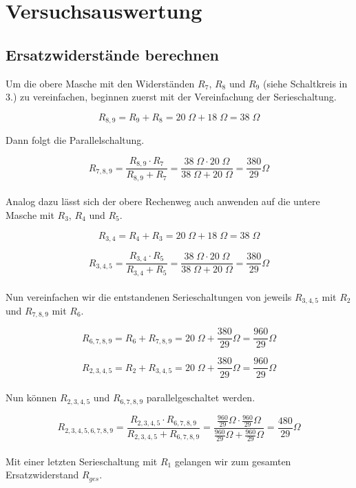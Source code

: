 \documentclass[a4paper,12pt]{article}
\begin{document}
\newpage

\section{Versuchsauswertung}

\subsection{Ersatzwiderstände berechnen}

Um die obere Masche mit den Widerständen $R_7$, $R_8$ und $R_9$ (siehe Schaltkreis in 3.) zu vereinfachen, beginnen zuerst mit der Vereinfachung der Serieschaltung.

$$R_{8,9} = R_9 + R_8 = 20\;\Omega + 18 \;\Omega = 38 \;\Omega$$

Dann folgt die Parallelschaltung.

$$R_{7,8,9} = \frac{R_{8,9} \cdot R_7}{R_{8,9} + R_7} = \frac{38 \;\Omega \cdot 20\; \Omega}{38\; \Omega + 20\; \Omega} = \frac{380}{29}\Omega$$\\

Analog dazu lässt sich der obere Rechenweg auch anwenden auf die untere Masche mit $R_3$, $R_4$ und $R_5$.

$$R_{3,4} = R_4 + R_3 = 20 \;\Omega + 18 \;\Omega = 38 \;\Omega$$

$$R_{3,4,5} = \frac{R_{3,4} \cdot R_5}{R_{3,4} + R_5} = \frac{38\; \Omega \cdot 20\; \Omega}{38\; \Omega + 20\; \Omega} = \frac{380}{29}\Omega$$\\

Nun vereinfachen wir die entstandenen Serieschaltungen von jeweils $R_{3,4,5}$ mit $R_2$ und $R_{7,8,9}$ mit $R_6$.

$$R_{6,7,8,9} = R_6 + R_{7,8,9} = 20\; \Omega + \frac{380}{29} \Omega = \frac{960}{29} \Omega$$

$$R_{2,3,4,5} = R_2 + R_{3,4,5} = 20\; \Omega + \frac{380}{29} \Omega = \frac{960}{29} \Omega$$\\

Nun können $R_{2,3,4,5}$ und $R_{6,7,8,9}$ parallelgeschaltet werden.

$$R_{2,3,4,5,6,7,8,9} = \frac{R_{2,3,4,5} \cdot R_{6,7,8,9}}{R_{2,3,4,5} + R_{6,7,8,9}} = \frac{\frac{960}{29}\Omega \cdot \frac{960}{29}\Omega}{\frac{960}{29}\Omega + \frac{960}{29}\Omega} = \frac{480}{29}\Omega$$\\

Mit einer letzten Serieschaltung mit $R_1$ gelangen wir zum gesamten Ersatzwiderstand $R_{ges}$.
\end{document}
